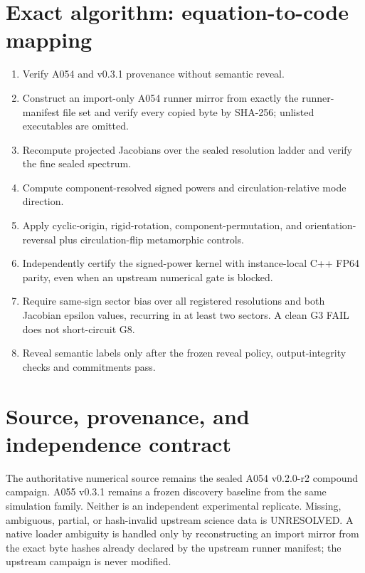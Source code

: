 \documentclass[11pt,a4paper]{article}
\begin{document}
\section{Exact algorithm: equation-to-code mapping}
\begin{enumerate}[label=S\arabic*.]
\item Verify A054 and v0.3.1 provenance without semantic reveal.
\item Construct an import-only A054 runner mirror from exactly the runner-manifest file set and verify every copied byte by SHA-256; unlisted executables are omitted.
\item Recompute projected Jacobians over the sealed resolution ladder and verify the fine sealed spectrum.
\item Compute component-resolved signed powers and circulation-relative mode direction.
\item Apply cyclic-origin, rigid-rotation, component-permutation, and orientation-reversal plus circulation-flip metamorphic controls.
\item Independently certify the signed-power kernel with instance-local C++ FP64 parity, even when an upstream numerical gate is blocked.
\item Require same-sign sector bias over all registered resolutions and both Jacobian epsilon values, recurring in at least two sectors. A clean G3 FAIL does not short-circuit G8.
\item Reveal semantic labels only after the frozen reveal policy, output-integrity checks and commitments pass.
\end{enumerate}
\section{Source, provenance, and independence contract}
The authoritative numerical source remains the sealed A054 v0.2.0-r2 compound campaign. A055 v0.3.1 remains a frozen discovery baseline from the same simulation family. Neither is an independent experimental replicate. Missing, ambiguous, partial, or hash-invalid upstream science data is UNRESOLVED. A native loader ambiguity is handled only by reconstructing an import mirror from the exact byte hashes already declared by the upstream runner manifest; the upstream campaign is never modified.
\end{document}
